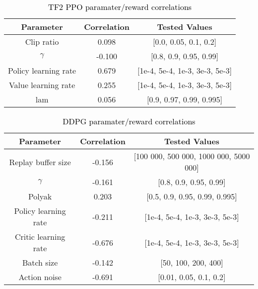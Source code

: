 \documentclass[letterpaper, 10 pt, conference]{ieeeconf} %
\newcommand{\rev}[1]{\textcolor{black}{#1}}
\begin{document}
    \begin{table*}[t]
        \centering
        \caption{\rev{TF2 PPO paramater/reward correlations}}
        \rev{
        \begin{tabular}{c|c|c}
            \hline
            Parameter   & Correlation & Tested Values \\ \hline
            Clip ratio  &  0.098 & [0.0, 0.05, 0.1, 0.2] \\ 
            $\gamma$       & -0.100 & [0.8, 0.9, 0.95, 0.99]\\ 
            Policy learning rate       &  0.679 & [1e-4, 5e-4, 1e-3, 3e-3, 5e-3] \\ 
            Value learning rate       &  0.255 & [1e-4, 5e-4, 1e-3, 3e-3, 5e-3] \\
            lam         &  0.056 & [0.9, 0.97, 0.99, 0.995] \\ \hline
        \end{tabular}
        }
        \label{tab:ppo_corr}
    \end{table*}
    
    \begin{table*}[t]
        \centering
        \caption{\rev{DDPG paramater/reward correlations}}
        \rev{
        \begin{tabular}{c|c|c}
            \hline
            Parameter   & Correlation & Tested Values \\ \hline
            Replay buffer size  & -0.156 & [100 000, 500 000, 1000 000, 5000 000] \\
            $\gamma$        & -0.161 & [0.8, 0.9, 0.95, 0.99] \\
            Polyak       &  0.203 & [0.5, 0.9, 0.95, 0.99, 0.995] \\
            Policy learning rate        & -0.211 & [1e-4, 5e-4, 1e-3, 3e-3, 5e-3] \\
            Critic learning rate         & -0.676 & [1e-4, 5e-4, 1e-3, 3e-3, 5e-3] \\
            Batch size   & -0.142 & [50, 100, 200, 400] \\
            Action noise    & -0.691 & [0.01, 0.05, 0.1, 0.2] \\ \hline
        \end{tabular}
        }
        \label{tab:ddpg_corr}
    \end{table*}
    
\end{document}
